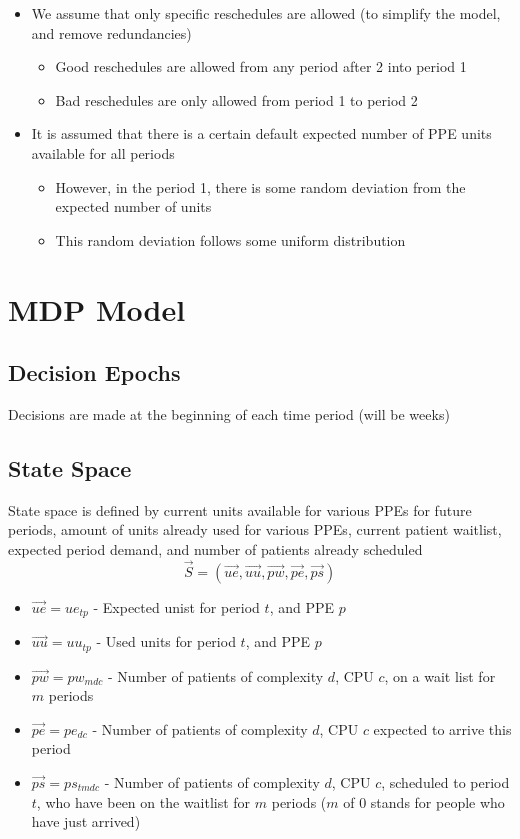 \documentclass{article}
\begin{document}
\begin{itemize}
	\item We assume that only specific reschedules are allowed (to simplify the model, and remove  redundancies)
		\begin{itemize}
			\item Good reschedules are allowed from any period after 2 into period 1
			\item Bad reschedules are only allowed from period 1 to period 2
		\end{itemize}
	
	\item It is assumed that there is a certain default expected number of PPE units available for all periods
		\begin{itemize}
			\item However, in the period 1, there is some random deviation from the expected number of units
			\item This random deviation follows some uniform distribution
		\end{itemize}
\end{itemize}

\section{MDP Model}
\subsection{Decision Epochs}
Decisions are made at the beginning of each time period (will be weeks)

\subsection{State Space}
State space is defined by current units available for various PPEs for future periods, amount of units already used for various PPEs, current patient waitlist, expected period demand, and number of patients already scheduled
\[  \vec{S}  = (\vec{ue}, \vec{uu}, \vec{pw}, \vec{pe}, \vec{ps}) \]
\begin{itemize}
    \item $\vec{ue} = ue_{tp}$ - Expected unist for period $t$, and PPE $p$
    \item $\vec{uu} = uu_{tp}$ - Used units for period $t$, and PPE $p$
    \item $\vec{pw} = pw_{mdc}$ - Number of patients of complexity $d$, CPU $c$, on a wait list for $m$ periods
    \item $\vec{pe} = pe_{dc}$ - Number of patients of complexity $d$, CPU $c$ expected to arrive this period
    \item $\vec{ps} = ps_{tmdc}$ - Number of patients of complexity $d$, CPU $c$, scheduled to period $t$, who have been on the waitlist for $m$ periods ($m$ of 0 stands for people who have just arrived)
\end{itemize}
\end{document}
